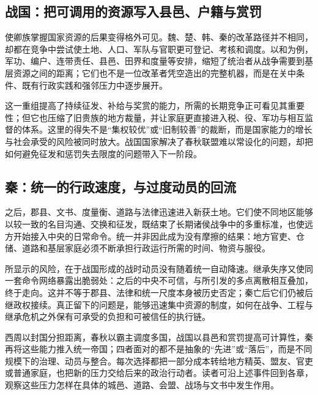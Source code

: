 \subsection{战国：把可调用的资源写入县邑、户籍与赏罚}

使卿族掌握国家资源的后果变得格外可见。魏、楚、韩、秦的改革路径并不相同，却都在竞争中尝试使土地、人口、军队与官职更可登记、考核和调度。以和为例，军功、编户、连带责任、县邑、田界和度量等安排，缩短了统治者从战争需要到基层资源之间的距离；它们也不是一位改革者凭空造出的完整机器，而是在关中条件、既有行政实践和强邻压力中逐步展开。

这一重组提高了持续征发、补给与奖赏的能力，所需的长期竞争正可看见其重要性；但它也压缩了旧贵族的地方裁量，并让家庭更直接进入税、役、军功与相互监督的体系。这里的得失不是“集权较优”或“旧制较善”的裁断，而是国家能力的增长与社会承受的风险被同时放大。战国国家解决了春秋联盟难以常设化的问题，却把如何避免征发和惩罚失去限度的问题带入下一阶段。

\subsection{秦：统一的行政速度，与过度动员的回流}

之后，郡县、文书、度量衡、道路与法律迅速进入新获土地。它们使不同地区能够以较一致的名目沟通、交换和征发，既结束了长期诸侯战争中的多重标准，也使远方开始接入中央的日常命令。统一并非因此成为没有摩擦的结果：地方官吏、仓储、道路和基层家庭必须不断承担行政运行所需的时间、物资与服役。

所显示的风险，在于战国形成的战时动员没有随着统一自动降速。继承失序又使同一套命令网络暴露出脆弱处：之后的中央不可信，与所引发的多点离散相互叠加，终于走向。这并不等于郡县、法律和统一尺度本身被历史否定；秦亡后它们仍被后继政权接续。真正留下的问题是，能够迅速集中资源的制度，如何在战争、工程与继承危机之外保有可承受的负担和可被信任的执行链。

\begin{turningpoint}
西周以封国分担距离，春秋以霸主调度多国，战国以县邑和赏罚提高可计算性，秦再将这些能力推入统一帝国；四者面对的都不是抽象的“先进”或“落后”，而是不同规模下的治理、动员与整合。每次选择都把一部分成本转给地方精英、盟友、官吏或普通家庭，也把新的压力交给后来的政治行动者。读者可沿上述事件回到各章，观察这些压力怎样在具体的城邑、道路、会盟、战场与文书中发生作用。
\end{turningpoint}

